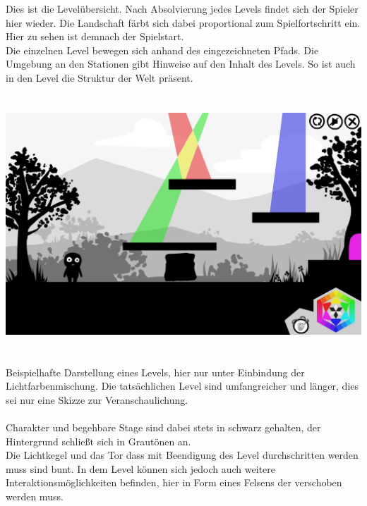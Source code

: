\documentclass[10pt,a4paper,notitlepage]{report}
\begin{document}
	\Text
	Dies ist die Levelübersicht. Nach Absolvierung jedes Levels findet sich der Spieler hier wieder. Die Landschaft färbt sich dabei proportional zum Spielfortschritt 		ein. Hier zu sehen ist demnach der Spielstart.\\
	Die einzelnen Level bewegen sich anhand des eingezeichneten Pfads. Die Umgebung an den Stationen gibt Hinweise auf den Inhalt des Levels. 
	So ist auch in den Level die Struktur der Welt präsent.
	\clearpage\
	\\
	\\
	\\
	\includegraphics[width=1\textwidth]{png/screen.png}\
	\\\\
	\Text
	Beispielhafte Darstellung eines Levels, hier nur unter Einbindung der Lichtfarbenmischung. Die tatsächlichen Level sind umfangreicher und länger,
	dies sei nur eine Skizze zur Veranschaulichung.\\\\
	Charakter und begehbare Stage sind dabei stets in schwarz gehalten, der Hintergrund schließt sich in Grautönen an.\\
	Die Lichtkegel und das Tor dass mit Beendigung des Level durchschritten werden muss sind bunt. In dem Level können sich jedoch auch weitere
	Interaktionsmöglichkeiten befinden, hier in Form eines Felsens der verschoben werden muss.
	\\\\
	\\\\
	\Fusszeile
\end{document}

